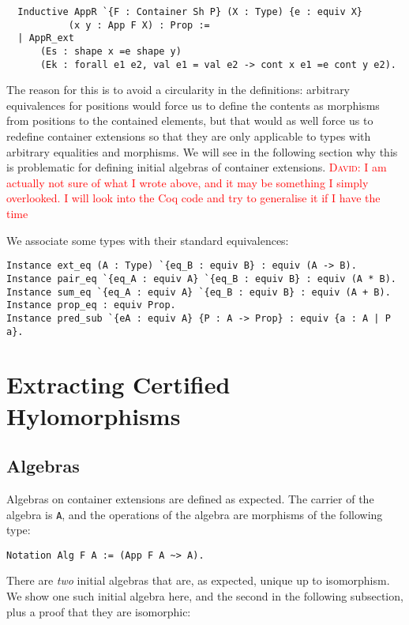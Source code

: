 \documentclass[a4paper, UKenglish, cleveref, autoref, thm-restate]{lipics-v2021}
\newcommand{\dcas}[1]{\textcolor{red}{\textsc{David}: #1}}
\begin{document}
\begin{verbatim}
  Inductive AppR `{F : Container Sh P} (X : Type) {e : equiv X}
           (x y : App F X) : Prop :=
  | AppR_ext
      (Es : shape x =e shape y)
      (Ek : forall e1 e2, val e1 = val e2 -> cont x e1 =e cont y e2).
\end{verbatim}
The reason for this is to avoid a circularity in the definitions: arbitrary
equivalences for positions would force us to define the contents as morphisms
from positions to the contained elements, but that would as well force us to
redefine container extensions so that they are only applicable to types with
arbitrary equalities and morphisms.  We will see in the following section why
this is problematic for defining initial algebras of container extensions.
\dcas{I am actually not sure of what I wrote above, and it may be something I
simply overlooked. I will look into the Coq code and try to generalise it if I
have the time}

We associate some types with their standard equivalences:
\begin{verbatim}
Instance ext_eq (A : Type) `{eq_B : equiv B} : equiv (A -> B).
Instance pair_eq `{eq_A : equiv A} `{eq_B : equiv B} : equiv (A * B).
Instance sum_eq `{eq_A : equiv A} `{eq_B : equiv B} : equiv (A + B).
Instance prop_eq : equiv Prop.
Instance pred_sub `{eA : equiv A} {P : A -> Prop} : equiv {a : A | P a}.
\end{verbatim}

\section{Extracting Certified Hylomorphisms}

\subsection{Algebras}

Algebras on container extensions are defined as expected. The carrier of the
algebra is \texttt{A}, and the operations of the algebra are
morphisms of the following type:
\begin{verbatim}
Notation Alg F A := (App F A ~> A).
\end{verbatim}

There are \emph{two} initial algebras that are, as expected, unique up to
isomorphism. We show one such initial algebra here, and the second in the
following subsection, plus a proof that they are isomorphic:
\end{document}
